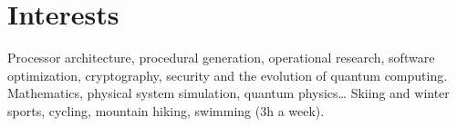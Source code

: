 \documentclass[a4paper,10pt,sans]{moderncv}
\begin{document}

	\vspace*{\deletedSpace}
	\printbibliography[title=Publications]{}


	\vspace*{\deletedSpace}
	\section{Interests}
			{Processor architecture, procedural generation, operational research, software optimization, cryptography, security and the evolution of quantum computing.}
			{Mathematics, physical system simulation, quantum physics\ldots}
			{Skiing and winter sports, cycling, mountain hiking, swimming (3h a week).}
\end{document}
